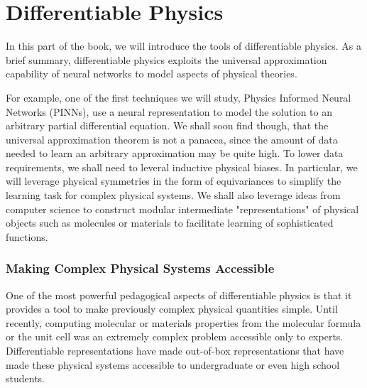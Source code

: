 \documentclass[book.tex]{subfiles}
\begin{document}
\part{Differentiable Physics}
\label{part:diffphys}

%


In this part of the book, we will introduce the tools of differentiable physics. As a brief summary, differentiable physics exploits the universal approximation capability of neural networks to model aspects of physical theories.

For example, one of the first techniques we will study, Physics Informed Neural Networks (PINNs), use a neural representation to model the solution to an arbitrary partial differential equation. We shall soon find though, that the universal approximation theorem is not a panacea, since the amount of data needed to learn an arbitrary approximation may be quite high. To lower data requirements, we shall need to leveral inductive physical biases. In particular, we will leverage physical symmetries in the form of equivariances to simplify the learning task for complex physical systems. We shall also leverage ideas from computer science to construct modular intermediate "representations" of physical objects such as molecules or materials to facilitate learning of sophisticated functions.


\section{Making Complex Physical Systems Accessible}

One of the most powerful pedagogical aspects of differentiable physics is that it provides a tool to make previously complex physical quantities simple. Until recently, computing molecular or materials properties from the molecular formula or the unit cell was an extremely complex problem accessible only to experts. Differentiable representations have made out-of-box representations that have made these physical systems accessible to undergraduate or even high school students. 
\end{document}
